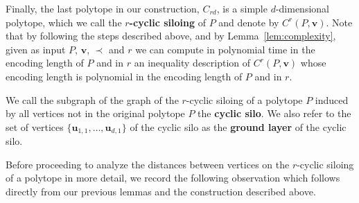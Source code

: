 \documentclass[centering,11pt,reqno]{amsart}
\theoremstyle{definition}
\begin{document}
Finally, the last polytope in our construction, $C_{rd}$, is a simple $d$-dimensional polytope, which we call the \textbf{$r$-cyclic siloing} of $P$ and denote by $C^r(P,\mathbf{v})$. Note that by following the steps described above, and by Lemma~\ref{lem:complexity}, given as input $P$, $\mathbf{v}$, $\prec$ and $r$ we can compute in polynomial time in the encoding length of $P$ and in $r$ an inequality description of $C^r(P,\mathbf{v})$ whose encoding length is polynomial in the encoding length of $P$ and in $r$.

We call the subgraph of the graph of the $r$-cyclic siloing of a polytope $P$ induced by all vertices not in the original polytope $P$ the \textbf{cyclic silo}. We also refer to the set of vertices $\{\mathbf{u}_{1,1},\ldots,\mathbf{u}_{d,1}\}$ of the cyclic silo as the \textbf{ground layer} of the cyclic silo.

Before proceeding to analyze the distances between vertices on the $r$-cyclic siloing of a polytope in more detail, we record the following observation which follows directly from our previous lemmas and the construction described above.
\end{document}
